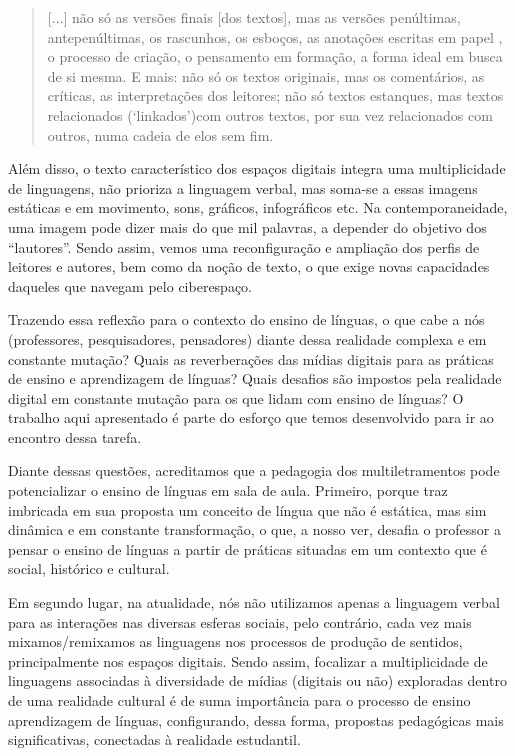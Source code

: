 	\begin{quote}
	[$\ldots$] não só as versões finais [dos textos], mas as versões penúltimas, antepenúltimas, os rascunhos, os esboços, as anotações escritas em papel \newline
	[$\ldots$], o processo de criação, o pensamento em formação, a forma ideal em busca de si mesma. E mais: não só os textos originais, mas os comentários, as críticas, as interpretações dos leitores; não só textos estanques, mas textos relacionados (‘linkados’)com outros textos, por sua vez relacionados com outros, numa cadeia de elos sem fim.
	\end{quote}
	Além disso, o texto característico dos espaços digitais integra uma multiplicidade de linguagens, não prioriza a linguagem verbal, mas soma-se a essas imagens estáticas e em movimento, sons, gráficos, infográficos etc. Na contemporaneidade, uma imagem pode dizer mais do que mil palavras, a depender do objetivo dos “lautores”. Sendo assim, vemos uma reconfiguração e ampliação dos perfis de leitores e autores, bem como da noção de texto, o que exige novas capacidades daqueles que navegam pelo ciberespaço.
	
	Trazendo essa reflexão para o contexto do ensino de línguas, o que cabe a nós (professores, pesquisadores, pensadores) diante dessa realidade complexa e em constante mutação? Quais as reverberações das mídias digitais para as práticas de ensino e aprendizagem de línguas? Quais desafios são impostos pela realidade digital em constante mutação para os que lidam com ensino de línguas? O trabalho aqui apresentado é parte do esforço que temos desenvolvido para ir ao encontro dessa tarefa.
	
	Diante dessas questões, acreditamos que a pedagogia dos multiletramentos pode potencializar o ensino de línguas em sala de aula. Primeiro, porque traz imbricada em sua proposta um conceito de língua que não é estática, mas sim dinâmica e em constante transformação, o que, a nosso ver, desafia o professor a pensar o ensino de línguas a partir de práticas situadas em um contexto que é social, histórico e cultural.
	
	Em segundo lugar, na atualidade, nós não utilizamos apenas a linguagem verbal para as interações nas diversas esferas sociais, pelo contrário, cada vez mais mixamos/remixamos as linguagens nos processos de produção de sentidos, principalmente nos espaços digitais. Sendo assim, focalizar a multiplicidade de linguagens associadas à diversidade de mídias (digitais ou não) exploradas dentro de uma realidade cultural é de suma importância para o processo de ensino aprendizagem de línguas, configurando, dessa forma, propostas pedagógicas mais significativas, conectadas à realidade estudantil.
	
